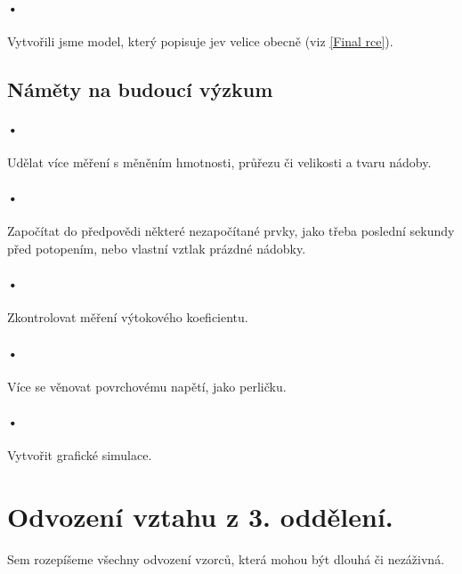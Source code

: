 \documentclass[14pt,a4paper]{article}
\begin{document}
\paragraph{•}Vytvořili jsme model, který popisuje jev velice obecně (viz \ref{Final rce}).
\subsection{Náměty na budoucí výzkum}
\paragraph{•}Udělat více měření s měněním hmotnosti, průřezu či velikosti a tvaru nádoby.
\paragraph{•}Započítat do předpovědi některé nezapočítané prvky, jako třeba poslední sekundy před potopením, nebo vlastní vztlak prázdné nádobky.
\paragraph{•}Zkontrolovat měření výtokového koeficientu.
\paragraph{•}Více se věnovat povrchovému napětí, jako perličku.
\paragraph{•}Vytvořit grafické simulace.
\newpage
\section{Odvození vztahu z 3. oddělení.}
Sem rozepíšeme všechny odvození vzorců, která mohou být dlouhá či nezáživná.
\end{document}
